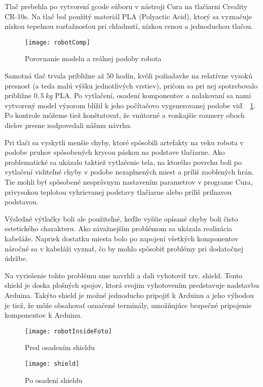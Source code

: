 Tlač prebehla po vytvorení gcode súboru v nástroji Cura na tlačiarni Creality CR-10s. Na tlač bol použitý materiál PLA (Polyactic Acid), ktorý sa vyznačuje nízkou tepelnou rozťažnosťou pri chladnutí, nízkou cenou a jednoduchou tlačou. 

\begin{figure}
\centering
\texttt{[image: robotComp]}
\caption{Porovnanie modelu a reálnej podoby robota}
\label{fig:robotComp}
\end{figure}

Samotná tlač trvala približne až 50 hodín, kvôli požiadavke na relatívne vysokú presnosť (a teda malú výšku jednotlivých vrstiev), pričom sa pri nej spotrebovalo približne $0,5~kg$ PLA. Po vytlačení, osadení komponentov a nalakovaní sa nami vytvorený model výzorom blížil k jeho počítačovo vygenerovanej podobe viď. \figurename~\ref{fig:robotComp}. Po kontrole môžeme tiež konštatovať, že vnútorné a vonkajšie rozmery oboch dielov presne zodpovedali nášmu návrhu.

Pri tlači sa vyskytli menšie chyby, ktoré spôsobili artefakty na veku robota v podobe pruhov spôsobených krycou páskou na podstave tlačiarne. Ako problematické sa ukázalo taktiež vytlačenie tela, na ktorého povrchu boli po vytlačení viditeľné chyby v podobe nezaplnených miest a príliš zaoblených hrán. Tie mohli byť spôsobené nesprávnym nastavením parametrov v programe Cura, privysokou teplotou vyhrievanej podstavy tlačiarne alebo príliš priľnavou podstavou. 

Výsledné výtlačky boli ale použiteľné, keďže vyššie opísané chyby boli čisto estetického charakteru. Ako závažnejším problémom sa ukázala realizácia kabeláže. Napriek dostatku miesta bolo po zapojení všetkých komponentov náročné sa v kabeláži vyznať, čo by mohlo spôsobiť problémy pri dodatočnej údržbe. 

Na vyriešenie tohto problému sme navrhli a dali vyhotoviť tzv. shield. Tento shield je doska plošných spojov, ktorá svojim vyhotovením predstavuje nadstavbu Arduina. Takýto shield je možné jednoducho pripojiť k Arduinu a jeho výhodou je tiež, že môže obsahovať označené terminály, umožňujúce bezpečné pripojenie komponentov k Arduinu. 

\begin{figure}[h]
\centering
\begin{minipage}[b]{0.48\textwidth}
\centering
\texttt{[image: robotInsideFoto]}
\caption{Pred osadením shieldu}
\label{fig:robot_no_shield}
\end{minipage}\quad
\begin{minipage}[b]{0.48\textwidth}
\centering
\texttt{[image: shield]}
\caption{Po osadení shieldu}
\label{fig:robot_shield}
\end{minipage}
\label{fig:comparison}
\end{figure}

